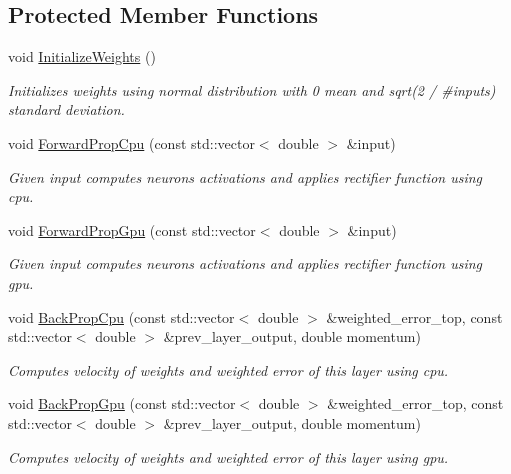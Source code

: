 \subsection*{Protected Member Functions}
\begin{DoxyCompactItemize}
\item 
\mbox{\label{classneuralnet_1_1ReLuLayer_a38812efc6cee58ae2e076a14dd2e76c0}} 
void \hyperlink{classneuralnet_1_1ReLuLayer_a38812efc6cee58ae2e076a14dd2e76c0}{Initialize\+Weights} ()
\begin{DoxyCompactList}\small\item\em Initializes weights using normal distribution with 0 mean and sqrt(2 / \#inputs) standard deviation. \end{DoxyCompactList}\item 
void \hyperlink{classneuralnet_1_1ReLuLayer_a8828d7147d25d9854452e9d2e1e79857}{Forward\+Prop\+Cpu} (const std\+::vector$<$ double $>$ \&input)
\begin{DoxyCompactList}\small\item\em Given input computes neurons\textquotesingle{} activations and applies rectifier function using cpu. \end{DoxyCompactList}\item 
void \hyperlink{classneuralnet_1_1ReLuLayer_a97dd16df35d4fb139e955d9a9acc2284}{Forward\+Prop\+Gpu} (const std\+::vector$<$ double $>$ \&input)
\begin{DoxyCompactList}\small\item\em Given input computes neurons\textquotesingle{} activations and applies rectifier function using gpu. \end{DoxyCompactList}\item 
void \hyperlink{classneuralnet_1_1ReLuLayer_a41da88c3eace20c2d8d2c397a9feb9d8}{Back\+Prop\+Cpu} (const std\+::vector$<$ double $>$ \&weighted\+\_\+error\+\_\+top, const std\+::vector$<$ double $>$ \&prev\+\_\+layer\+\_\+output, double momentum)
\begin{DoxyCompactList}\small\item\em Computes velocity of weights and weighted error of this layer using cpu. \end{DoxyCompactList}\item 
void \hyperlink{classneuralnet_1_1ReLuLayer_aafc499ba5e1de303b447ad1abb26f914}{Back\+Prop\+Gpu} (const std\+::vector$<$ double $>$ \&weighted\+\_\+error\+\_\+top, const std\+::vector$<$ double $>$ \&prev\+\_\+layer\+\_\+output, double momentum)
\begin{DoxyCompactList}\small\item\em Computes velocity of weights and weighted error of this layer using gpu. \end{DoxyCompactList}\end{DoxyCompactItemize}
